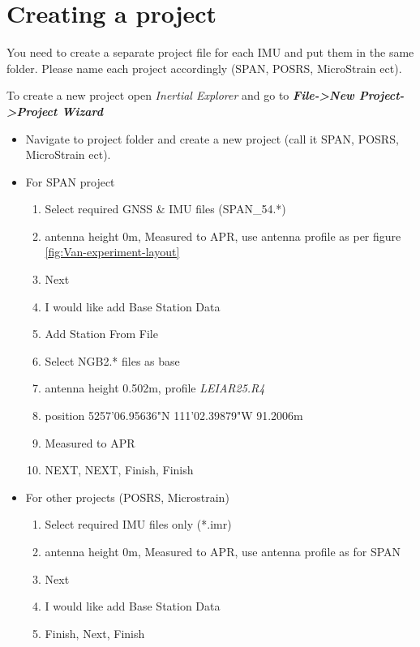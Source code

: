 \documentclass[british,DIV=calc, paper=a4, fontsize=12pt, onecolumn]{scrartcl}
\begin{document}
\section{Creating a project}\label{sec:Create-an-new}

You need to create a separate project file for each IMU and put them in the same folder. Please name each project accordingly (SPAN, POSRS, MicroStrain ect).\\
\bigskip

To create a new project open \emph{Inertial Explorer }and go to\textbf{\emph{ File->New Project->Project Wizard}}
\begin{itemize}
	\item Navigate to project folder and create a new project (call it SPAN, POSRS, MicroStrain ect). 
	\item For SPAN project
	\begin{enumerate}
		\item Select required GNSS \& IMU files (SPAN\_54.{*})
		\item antenna height 0m, Measured to APR, use antenna profile as per figure \ref{fig:Van-experiment-layout}
		\item Next
		\item I would like add Base Station Data
		\item Add Station From File
		\item Select NGB2.{*} files as base 
		\item antenna height 0.502m, profile \emph{LEIAR25.R4}
		\item position 52\textdegree{}57'06.95636"N 1\textdegree{}11'02.39879"W 91.2006m
		\item Measured to APR
		\item NEXT, NEXT, Finish, Finish
	\end{enumerate}
	\item For other projects (POSRS, Microstrain)
		\begin{enumerate}
			\item Select required IMU files only ({*}.imr)
			\item antenna height 0m, Measured to APR, use antenna profile as for SPAN
			\item Next
			\item I would like add Base Station Data
			\item Finish, Next, Finish
		\end{enumerate}
\end{itemize}
\end{document}
